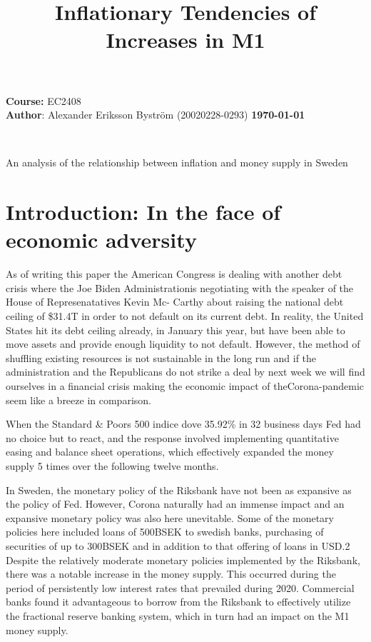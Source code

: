 \documentclass{article}
\title{Inflationary Tendencies of Increases in M1}
\date{}
\makeatletter
\renewcommand{\maketitle}{%
  \begin{mdframed}[style=titlestyle]
    \vspace*{0.5in}
    \hspace*{\dimexpr-\leftmargin-\oddsidemargin--1in}\raggedright %
    \textbf{\LARGE\@title} \\
    \hspace*{\dimexpr-\leftmargin-\oddsidemargin--1in}\raggedright %
     An analysis of the relationship between inflation and money supply in Sweden \\
    \vspace*{0.5in}
  \end{mdframed}
  \thispagestyle{empty}}
\makeatother
\begin{document}
\textcolor{mydarkblue}{\textbf{Course: }EC2408} \\
\textcolor{mydarkblue}{\textbf{Author}: Alexander Eriksson Byström (20020228-0293)}
\hspace*{5cm}\textcolor{mydarkblue}{\textbf{\today}} 

    \maketitle

    \vspace*{1cm}
    \section*{Introduction: In the face of economic adversity}
    As of writing this paper the American Congress is dealing with another debt crisis where the Joe
    Biden Administrationis negotiating with the speaker of the House of Represenatatives Kevin Mc-
    Carthy about raising the national debt ceiling of \$31.4T in order to not default on its current debt.
    In reality, the United States hit its debt ceiling already, in January this year, but have been able to
    move assets and provide enough liquidity to not default. However, the method of shuffling existing
    resources is not sustainable in the long run and if the administration and the Republicans do not
    strike a deal by next week we will find ourselves in a financial crisis making the economic impact of
    theCorona-pandemic seem like a breeze in comparison.

    When the Standard \& Poors 500 indice dove 35.92\% in 32 business days Fed had no choice but
    to react, and the response involved implementing quantitative easing and balance sheet operations,
    which effectively expanded the money supply 5 times over the following twelve months.

    In Sweden, the monetary policy of the Riksbank have not been as expansive as the policy of Fed.
    However, Corona naturally had an immense impact and an expansive monetary policy was also
    here unevitable. Some of the monetary policies here included loans of 500BSEK to swedish banks,
    purchasing of securities of up to 300BSEK and in addition to that offering of loans in USD.2 Despite
    the relatively moderate monetary policies implemented by the Riksbank, there was a notable increase
    in the money supply. This occurred during the period of persistently low interest rates that prevailed
    during 2020. Commercial banks found it advantageous to borrow from the Riksbank to effectively
    utilize the fractional reserve banking system, which in turn had an impact on the M1 money supply.
\end{document}
